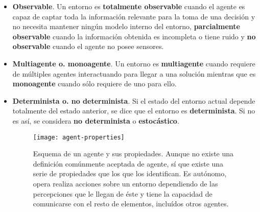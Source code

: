 \begin{itemize}
	\item \textbf{Observable}. Un entorno es \textbf{totalmente observable} cuando el agente es capaz de captar toda la información relevante para la toma de una decisión y no necesita mantener ningún modelo interno del entorno, \textbf{parcialmente observable} cuando la información obtenida es incompleta o tiene ruido y \textbf{no observable} cuando el agente no posee sensores.
	\item \textbf{Multiagente o. monoagente}. Un entorno es \textbf{multiagente} cuando requiere de múltiples agentes interactuando para llegar a una solución mientras que es \textbf{monoagente} cuando sólo requiere de uno para ello.
	\item \textbf{Determinista o. no determinista}. Si el estado del entorno actual depende totalmente del estado anterior, se dice que el entorno es \textbf{determinista}. Si no es así, se considera \textbf{no determinista} o \textbf{estocástico}.

\begin{figure}[t]
	\texttt{[image: agent-properties]}
	\caption[Esquema de agente y sus propiedades.]{Esquema de un agente y sus propiedades. Aunque no existe una definición comúnmente aceptada de agente, sí que existe una serie de propiedades que los que los identifican. Es autónomo, opera realiza acciones sobre un entorno dependiendo de las percepciones que le llegan de éste y tiene la capacidad de comunicarse con el resto de elementos, incluídos otros agentes.}
	\label{fig:agent-properties}
\end{figure}


\end{itemize}
